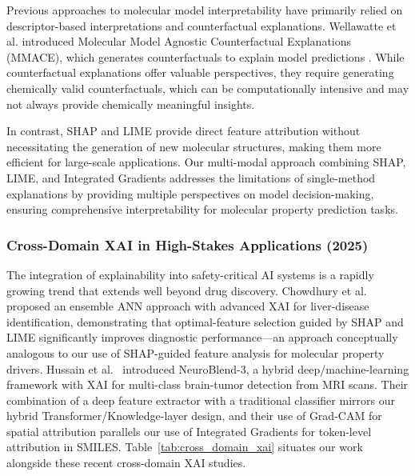 \documentclass[preprint,12pt]{elsarticle}
\begin{document}
Previous approaches to molecular model interpretability have primarily relied on descriptor-based interpretations and counterfactual explanations. Wellawatte et al. introduced Molecular Model Agnostic Counterfactual Explanations (MMACE), which generates counterfactuals to explain model predictions \cite{wellawatte2022mmace}. While counterfactual explanations offer valuable perspectives, they require generating chemically valid counterfactuals, which can be computationally intensive and may not always provide chemically meaningful insights.

In contrast, SHAP and LIME provide direct feature attribution without necessitating the generation of new molecular structures, making them more efficient for large-scale applications. Our multi-modal approach combining SHAP, LIME, and Integrated Gradients addresses the limitations of single-method explanations by providing multiple perspectives on model decision-making, ensuring comprehensive interpretability for molecular property prediction tasks.

\subsubsection*{Cross-Domain XAI in High-Stakes Applications (2025)}

The integration of explainability into safety-critical AI systems is a rapidly growing trend that extends well beyond drug discovery. Chowdhury et al.\ \cite{chowdhury2025ensemble} proposed an ensemble ANN approach with advanced XAI for liver-disease identification, demonstrating that optimal-feature selection guided by SHAP and LIME significantly improves diagnostic performance---an approach conceptually analogous to our use of SHAP-guided feature analysis for molecular property drivers. Hussain et al.\ \cite{hussain2025neuroblend} introduced NeuroBlend-3, a hybrid deep/machine-learning framework with XAI for multi-class brain-tumor detection from MRI scans. Their combination of a deep feature extractor with a traditional classifier mirrors our hybrid Transformer/Knowledge-layer design, and their use of Grad-CAM for spatial attribution parallels our use of Integrated Gradients for token-level attribution in SMILES. Table~\ref{tab:cross_domain_xai} situates our work alongside these recent cross-domain XAI studies.
\end{document}
